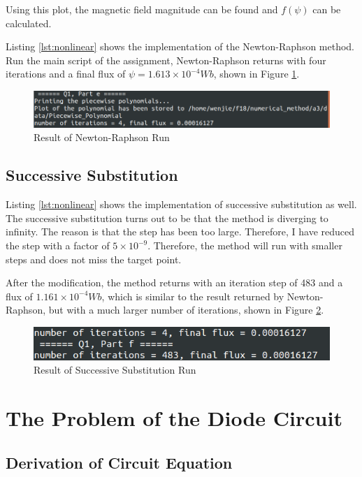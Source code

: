 \documentclass[a4paper,titlepage]{article}
\begin{document}
			Using this plot, the magnetic field magnitude can be found and $f(\psi)$ can be calculated.
			
			Listing \ref{lst:nonlinear} shows the implementation of the Newton-Raphson method. Run the main script of the assignment, Newton-Raphson returns with four iterations and a final flux of $\psi = 1.613 \times 10^{-4} Wb$, shown in Figure \ref{nr_em_result}. 
			\begin{figure}[!h]
				\centering
				\includegraphics[width=\linewidth]{newton_raphson_em_result}
				\caption{Result of Newton-Raphson Run}
				\label{nr_em_result}
			\end{figure}
		\subsection{Successive Substitution}
			Listing \ref{lst:nonlinear} shows the implementation of successive substitution as well. The successive substitution turns out to be that the method is diverging to infinity. The reason is that the step has been too large. Therefore, I have reduced the step with a factor of $5 \times 10^{-9}$. Therefore, the method will run with smaller steps and does not miss the target point. 
			
			After the modification, the method returns with an iteration step of 483 and a flux of $1.161 \times 10^{-4} Wb$, which is similar to the result returned by Newton-Raphson, but with a much larger number of iterations, shown in Figure \ref{ss_em_result}.
			\begin{figure}[!h]
				\centering
				\includegraphics[width=\linewidth]{ss_em_result}
				\caption{Result of Successive Substitution Run}
				\label{ss_em_result}
			\end{figure}
	\section{The Problem of the Diode Circuit}
		\subsection{Derivation of Circuit Equation}
			
\end{document}
